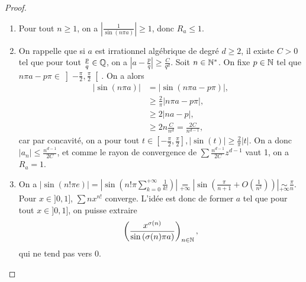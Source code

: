 \documentclass[12pt]{article}
\begin{document}
\begin{proof}
    \phantom{}
    \begin{enumerate}
        \item Pour tout $n\geqslant1$, on a $\left\lvert\frac{1}{\sin(n\pi a)}\right\rvert\geqslant1$, donc $R_a\leqslant1$.
        \item On rappelle que si $a$ est irrationnel algébrique de degré $d\geqslant2$, il existe $C>0$ tel que pour tout $\frac{p}{q}\in\mathbb{Q}$, on a $\left\lvert a-\frac{p}{q}\right\rvert\geqslant\frac{C}{q^{d}}$. Soit $n\in\mathbb{N}^{*}$. On fixe $p\in\mathbb{N}$ tel que $n\pi a-p\pi\in\left]-\frac{\pi}{2},\frac{\pi}{2}\right[$. On a alors
        \begin{align}
            \left\lvert \sin(n\pi a)\right\rvert
            &=\left\lvert\sin(n\pi a-p\pi)\right\rvert,\\
            &\geqslant\frac{2}{\pi}\left\lvert n\pi a-p\pi\right\rvert,\\
            &\geqslant2\left\lvert na-p\right\rvert,\\
            &\geqslant2n\frac{C}{n^{d}}=\frac{2C}{n^{d-1}},
        \end{align}
        car par concavité, on a pour tout $t\in\left[-\frac{\pi}{2},\frac{\pi}{2}\right],\left\lvert\sin(t)\right\rvert\geqslant\frac{2}{\pi}\left\lvert t\right\rvert$. On a donc $\left\lvert a_n\right\rvert\leqslant\frac{n^{d-1}}{2C}$, et comme le rayon de convergence de $\sum \frac{n^{d-1}}{2C}z^{d-1}$ vaut 1, on a $R_a=1$.
        \item On a $\left\lvert\sin(n!\pi e)\right\vert=\left\lvert\sin\left(n!\pi\sum_{k=0}^{+\infty}\frac{1}{k!}\right)\right\rvert\underset{+\infty}{=}\left\lvert\sin\left(\frac{\pi}{n+1}+O\left(\frac{1}{n^{2}}\right)\right)\right\rvert\underset{+\infty}{\sim}\frac{\pi}{n}$. Pour $x\in]0,1]$, $\sum nx^{n!}$ converge. L'idée est donc de former $a$ tel que pour tout $x\in]0,1]$, on puisse extraire 
        \begin{equation}
            \left(\frac{x^{\sigma(n)}}{\sin\left(\sigma(n)\pi a\right)}\right)_{n\in\mathbb{N}},
        \end{equation} 
        qui ne tend pas vers 0.
        

\end{enumerate}
\end{proof}
\end{document}
